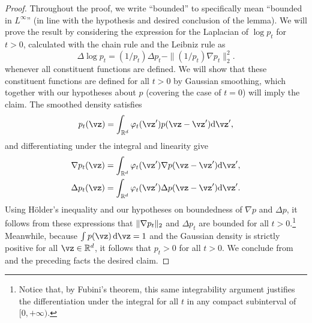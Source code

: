 \documentclass[../../book-main.tex]{subfiles}
\begin{document}
\begin{proof}
  Throughout the proof, we write ``bounded'' to specifically mean ``bounded in
  $L^\infty$'' (in line with the hypothesis and desired conclusion of the
  lemma).
  We will prove the result by considering the expression for the Laplacian of
  $\log p_t$ for $t>0$, calculated with the chain rule and the Leibniz rule as
  \begin{equation}\label{eq:log-laplacian-identity}
    \Delta \log p_t = (1/p_t) \Delta p_t - \| (1/p_t) \nabla p_t \|_2^2.
  \end{equation}
  whenever all constituent functions are defined. We will show that these
  constituent functions are defined for all $t>0$ by Gaussian smoothing, which
  together with our hypotheses about $p$ (covering the case of $t=0$) will imply
  the claim.
  The smoothed density satisfies
  \begin{equation*}
    p_t(\vz) = \int_{\R^d} \varphi_{t}(\vz') p(\vz - \vz') \mathrm{d} \vz',
  \end{equation*}
  and {differentiating under the integral} and linearity give
  \begin{align*}
    \nabla p_t(\vz) &= \int_{\R^d} \varphi_{t}(\vz') \nabla p(\vz-\vz') \mathrm{d} \vz',
    \\
    \Delta p_t(\vz)
    &= \int_{\R^d} \varphi_{t}(\vz') \Delta p(\vz - \vz') \mathrm{d} \vz'.
  \end{align*}
  Using H\"{o}lder's inequality and our hypotheses on boundedness of $\nabla
  p$ and $\Delta p$, it follows from these expressions that $\norm{\nabla
  p_t}_2$ and $\Delta p_t$ are bounded
  for all $t>0$.\footnote{Notice that, by Fubini's theorem, this same
  integrability argument justifies the differentiation under the integral for
  all $t$ in any compact subinterval of $[0, +\infty)$.}
  Meanwhile, because $\int p(\vz)\odif \vz = 1$ and the Gaussian density is strictly positive
  for all $\vz \in \R^d$, it follows that $p_t > 0$ for all $t>0$.
  We conclude from  and the preceding facts the
  desired claim.


\end{proof}
\end{document}
